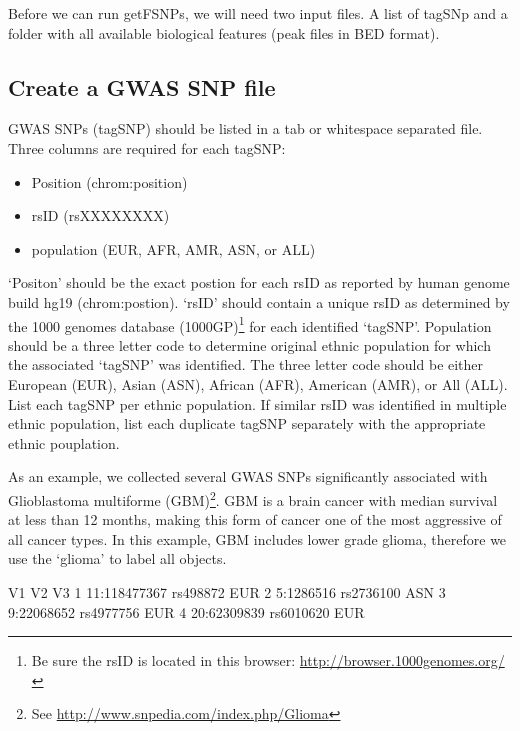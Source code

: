 \documentclass[12pt,fullpage]{article}
\begin{document}
Before we can run getFSNPs, we will need two input files. A list of tagSNp and a
folder with all available biological features (peak files in BED format).

\subsection{Create a GWAS SNP file}

GWAS SNPs (tagSNP) should be listed in a tab or whitespace separated file. Three
columns are required for each tagSNP: 

\begin{itemize}
\item Position (chrom:position)
\item rsID (rsXXXXXXXX)
\item population (EUR, AFR, AMR, ASN, or ALL)
\end{itemize}

`Positon' should be the exact postion for each rsID as reported by human genome
build hg19 (chrom:postion). `rsID' should contain a unique rsID as determined by
the 1000 genomes database (1000GP)\footnote{Be sure the rsID is located in this
browser: \url{http://browser.1000genomes.org/}} for each identified `tagSNP'.
Population should be a three letter code to determine original ethnic population
for which the associated `tagSNP' was identified. The three letter code should
be either European (EUR), Asian (ASN), African (AFR), American (AMR), or All
(ALL). List each tagSNP per ethnic population. If similar rsID was identified in
multiple ethnic population, list each duplicate tagSNP separately with the
appropriate ethnic pouplation.

As an example, we collected several GWAS SNPs significantly associated with
Glioblastoma multiforme (GBM)\footnote{See
\url{http://www.snpedia.com/index.php/Glioma}}. GBM is a brain cancer with
median survival at less than 12 months, making this form of cancer one of the
most aggressive of all cancer types. In this example, GBM includes lower grade
glioma, therefore we use the `glioma' to label all objects.

\begin{Schunk}
\begin{Soutput}
            V1        V2  V3
1 11:118477367  rs498872 EUR
2    5:1286516 rs2736100 ASN
3   9:22068652 rs4977756 EUR
4  20:62309839 rs6010620 EUR
\end{Soutput}
\end{Schunk}
\end{document}
